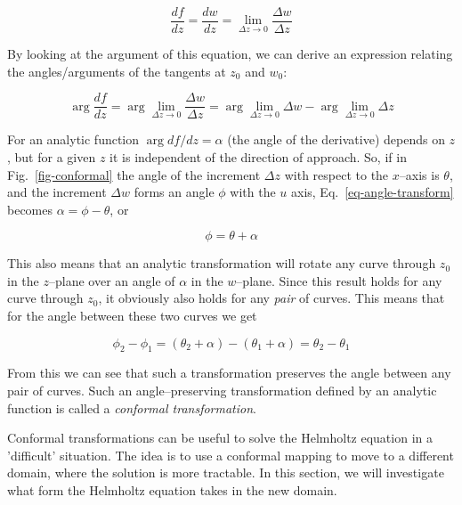 \begin{equation}
\frac{df}{dz} = \frac{dw}{dz} = \lim_{\Delta z \to 0} \frac{\Delta w}{\Delta z}
\end{equation}

By looking at the argument of this equation, we can derive an expression relating the angles/arguments of the tangents at $z_0$ and $w_0$:

\begin{equation}
\arg \frac{df}{dz} = \arg \lim_{\Delta z \to 0} \frac{\Delta w}{\Delta z} = \arg
\lim_{\Delta z   \to 0} \Delta w - \arg \lim_{\Delta z \to 0} \Delta z
\label{eq-angle-transform}
\end{equation} 

For an analytic function $\arg df / dz = \alpha$ (the angle of the derivative) depends on $z$, but for a given $z$ it is independent of the direction of approach. So, if in Fig.~\ref{fig-conformal} the angle of the increment $\Delta z$ with respect to the $x$--axis is $\theta$, and the increment $\Delta w$ forms an angle $\phi$ with the $u$ axis, Eq.~\ref{eq-angle-transform} becomes $\alpha = \phi - \theta $, or

\begin{equation}
\phi = \theta + \alpha
\end{equation}

This also means that an analytic transformation will rotate any curve through $z_0$ in the $z$--plane over an angle of $\alpha$ in the $w$--plane. Since this result holds for any curve through $z_0$, it obviously also holds for any \emph{pair} of curves. This means that for the angle between these two curves we get

\begin{equation}
\phi_2 - \phi_1 = (\theta_2 + \alpha) - (\theta_1 + \alpha) = \theta_2 -
\theta_1
\end{equation} 

From this we can see that such a transformation preserves the angle between any pair of curves. Such an angle--preserving transformation defined by an analytic function is called a \emph{conformal transformation}.


Conformal transformations can be useful to solve the Helmholtz equation in a 'difficult' situation. The idea is to use a conformal mapping to move to a different domain, where the solution is more tractable. In this section, we will investigate what form the Helmholtz equation takes in the new domain.

